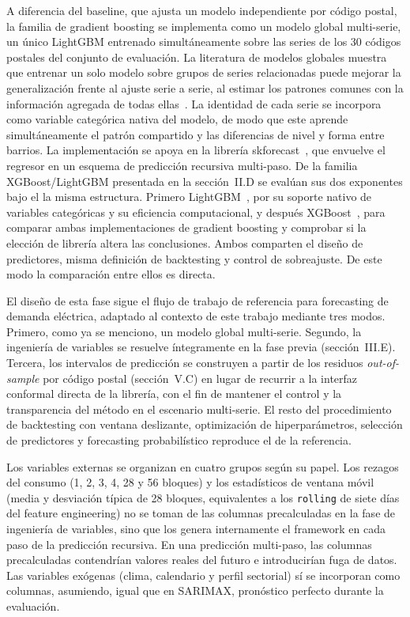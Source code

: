 \documentclass[12pt, a4paper]{article}
\begin{document}
A diferencia del baseline, que ajusta un modelo independiente por código postal, la familia de gradient boosting se implementa como un modelo global multi-serie, un único LightGBM entrenado simultáneamente sobre las series de los 30 códigos postales del conjunto de evaluación. La literatura de modelos globales muestra que entrenar un solo modelo sobre grupos de series relacionadas puede mejorar la generalización frente al ajuste serie a serie, al estimar los patrones comunes con la información agregada de todas ellas~\cite{montero2021}. La identidad de cada serie se incorpora como variable categórica nativa del modelo, de modo que este aprende simultáneamente el patrón compartido y las diferencias de nivel y forma entre barrios. La implementación se apoya en la librería skforecast~\cite{skforecast}, que envuelve el regresor en un esquema de predicción recursiva multi-paso. De la familia XGBoost/LightGBM presentada en la sección~II.D se evalúan sus dos exponentes bajo el la misma estructura. Primero LightGBM~\cite{ke2017}, por su soporte nativo de variables categóricas y su eficiencia computacional, y después XGBoost~\cite{chen2016}, para comparar ambas implementaciones de gradient boosting y comprobar si la elección de librería altera las conclusiones. Ambos comparten el  diseño de predictores, misma definición de backtesting y control de sobreajuste. De este modo  la comparación entre ellos es directa.

El diseño de esta fase sigue el flujo de trabajo de referencia para forecasting de demanda eléctrica, adaptado al contexto de este trabajo mediante tres modos. Primero, como ya se menciono, un modelo global multi-serie. Segundo, la ingeniería de variables se resuelve íntegramente en la fase previa (sección~III.E). Tercera, los intervalos de predicción se construyen a partir de los residuos \textit{out-of-sample} por código postal (sección~V.C) en lugar de recurrir a la interfaz conformal directa de la librería, con el fin de mantener el control y la transparencia del método en el escenario multi-serie. El resto del procedimiento de backtesting con ventana deslizante, optimización de hiperparámetros, selección de predictores y forecasting probabilístico reproduce el de la referencia.

Los variables externas se organizan en cuatro grupos según su papel. Los rezagos del consumo (1, 2, 3, 4, 28 y 56 bloques) y los estadísticos de ventana móvil (media y desviación típica de 28 bloques, equivalentes a los \texttt{rolling} de siete días del feature engineering) no se toman de las columnas precalculadas en la fase de ingeniería de variables, sino que los genera internamente el framework en cada paso de la predicción recursiva. En una predicción multi-paso, las columnas precalculadas contendrían valores reales del futuro e introducirían fuga de datos. Las variables exógenas (clima, calendario y perfil sectorial) sí se incorporan como columnas, asumiendo, igual que en SARIMAX, pronóstico perfecto durante la evaluación.
\end{document}
